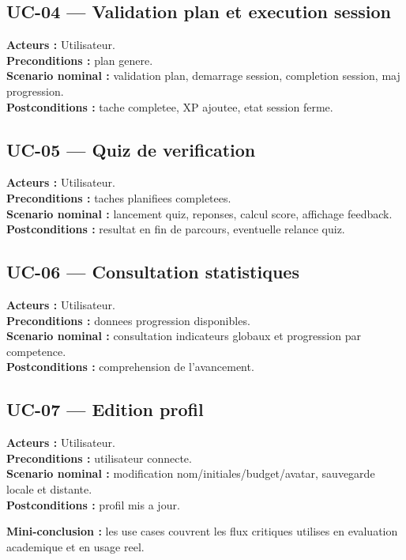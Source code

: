 \documentclass[12pt,a4paper]{article}
\begin{document}
\subsection{UC-04 --- Validation plan et execution session}
\textbf{Acteurs :} Utilisateur.\\
\textbf{Preconditions :} plan genere.\\
\textbf{Scenario nominal :} validation plan, demarrage session, completion session, maj progression.\\
\textbf{Postconditions :} tache completee, XP ajoutee, etat session ferme.

\subsection{UC-05 --- Quiz de verification}
\textbf{Acteurs :} Utilisateur.\\
\textbf{Preconditions :} taches planifiees completees.\\
\textbf{Scenario nominal :} lancement quiz, reponses, calcul score, affichage feedback.\\
\textbf{Postconditions :} resultat en fin de parcours, eventuelle relance quiz.

\subsection{UC-06 --- Consultation statistiques}
\textbf{Acteurs :} Utilisateur.\\
\textbf{Preconditions :} donnees progression disponibles.\\
\textbf{Scenario nominal :} consultation indicateurs globaux et progression par competence.\\
\textbf{Postconditions :} comprehension de l'avancement.

\subsection{UC-07 --- Edition profil}
\textbf{Acteurs :} Utilisateur.\\
\textbf{Preconditions :} utilisateur connecte.\\
\textbf{Scenario nominal :} modification nom/initiales/budget/avatar, sauvegarde locale et distante.\\
\textbf{Postconditions :} profil mis a jour.

\textbf{Mini-conclusion :} les use cases couvrent les flux critiques utilises en evaluation academique et en usage reel.
\end{document}
